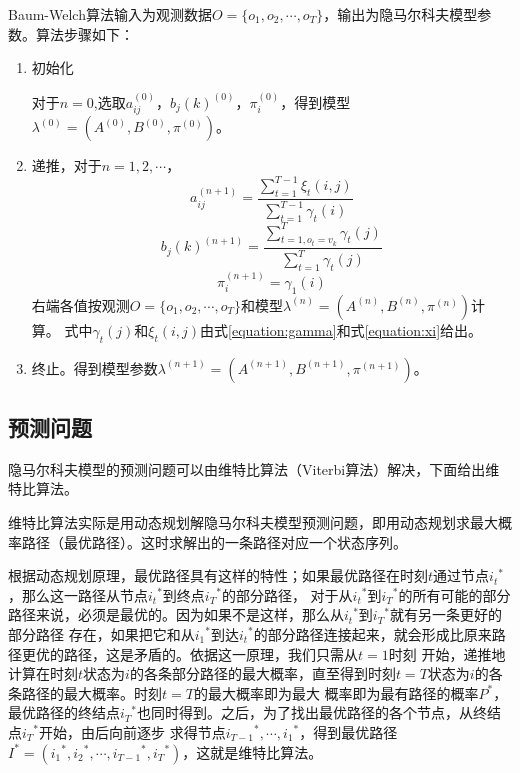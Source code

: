         \begin{algorithm}Baum-Welch算法输入为观测数据$O = \{ {o_1},{o_2}, \cdots ,{o_T}\}$，输出为隐马尔科夫模型参数。算法步骤如下：
            \begin{enumerate}
                \item 初始化

                    对于$n=0$,选取$a_{ij}^{(0)}$，${b_j}{(k)^{(0)}}$，$\pi _i^{(0)}$，得到模型${\lambda ^{(0)}} = \left( {{A^{(0)}},{B^{(0)}},{\pi ^{(0)}}} \right)$。
                \item 递推，对于$n = 1,2, \cdots $，
                    \[a_{ij}^{(n + 1)} = \frac{{\sum\limits_{t = 1}^{T - 1} {{\xi _t}(i,j)} }}{{\sum\limits_{t = 1}^{T - 1} {{\gamma _t}(i)} }}\]
                    \[{b_j}{(k)^{(n + 1)}} = \frac{{\sum\limits_{t = 1,{o_t} = {v_k}}^T {{\gamma _t}(j)} }}{{\sum\limits_{t = 1}^T {{\gamma _t}(j)} }}\]
                    \[\pi _i^{(n + 1)} = {\gamma _1}(i)\]
                    右端各值按观测$O = \{ {o_1},{o_2}, \cdots ,{o_T}\}$和模型${\lambda ^{(n)}} = \left( {{A^{(n)}},{B^{(n)}},{\pi ^{(n)}}} \right)$计算。
                    式中${{\gamma _t}(j)}$和${{\xi _t}(i,j)}$由式\ref{equation:gamma}和式\ref{equation:xi}给出。
               \item 终止。得到模型参数${\lambda ^{(n + 1)}} = \left( {{A^{(n + 1)}},{B^{(n + 1)}},{\pi ^{(n + 1)}}} \right)$。
            \end{enumerate}
        \end{algorithm}

    \subsection{预测问题}\label{section:predict}
    隐马尔科夫模型的预测问题可以由维特比算法（Viterbi算法）解决，下面给出维特比算法。

    维特比算法实际是用动态规划解隐马尔科夫模型预测问题，即用动态规划求最大概率路径（最优路径）。这时求解出的一条路径对应一个状态序列。

    根据动态规划原理，最优路径具有这样的特性；如果最优路径在时刻$t$通过节点${i_t}^*$，那么这一路径从节点${i_t}^*$到终点${i_T}^*$的部分路径，
    对于从${i_t}^*$到${i_T}^*$的所有可能的部分路径来说，必须是最优的。因为如果不是这样，那么从${i_t}^*$到${i_T}^*$就有另一条更好的部分路径
    存在，如果把它和从${i_1}^*$到达${i_t}^*$的部分路径连接起来，就会形成比原来路径更优的路径，这是矛盾的。依据这一原理，我们只需从$t=1$时刻
    开始，递推地计算在时刻$t$状态为$i$的各条部分路径的最大概率，直至得到时刻$t=T$状态为$i$的各条路径的最大概率。时刻$t=T$的最大概率即为最大
    概率即为最有路径的概率${P^*}$，最优路径的终结点${i_T}^*$也同时得到。之后，为了找出最优路径的各个节点，从终结点${i_T}^*$开始，由后向前逐步
    求得节点${i_{T - 1}}^*, \cdots ,{i_1}^*$，得到最优路径${I^*} = ({i_1}^*,{i_2}^*, \cdots ,{i_{T - 1}}^*,{i_T}^*)$，这就是维特比算法。

